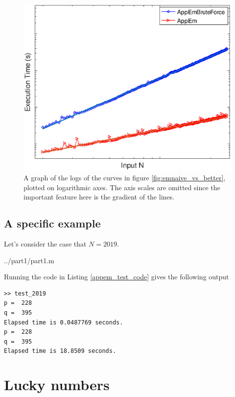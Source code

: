 \documentclass[10pt]{article}
\begin{document}
\begin{figure}[!htb]

   \includegraphics[scale=0.5]{bruteforce_vs_better_logs.eps}

   \caption{A graph of the logs of the curves in figure \ref{fig:emnaive_vs_better}, plotted on logarithmic axes. The axis scales are omitted since the important feature here is the gradient of the lines.}
      \label{loglog}
\end{figure}

\subsection{A specific example}

Let's consider the case that $N = 2019$. 

   {../part1/part1.m}
  
Running the code in Listing \ref{appem_test_code} gives the following output

\begin{verbatim}
>> test_2019
p =  228
q =  395
Elapsed time is 0.0487769 seconds.
p =  228
q =  395
Elapsed time is 18.8509 seconds.
\end{verbatim}

\section{Lucky numbers}
\end{document}
